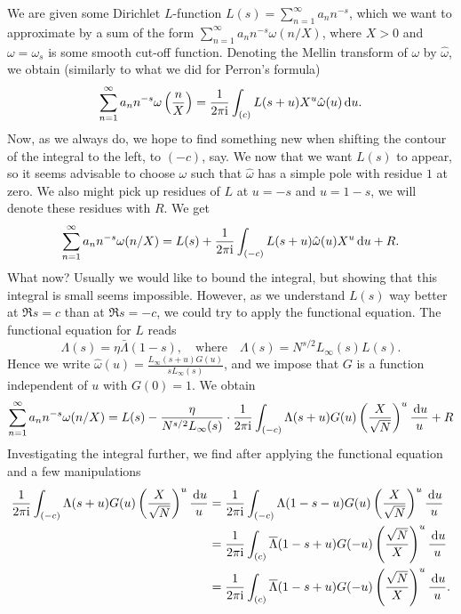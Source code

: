 \documentclass[a4paper,11pt]{article}
\begin{document}
We are given some Dirichlet $L$-function $L(s) = \sum_{n=1}^\infty a_n n^{-s}$,
which we want to approximate by a sum of the form 
$\sum_{n=1}^\infty a_n n^{-s} \omega(n/X)$, where $X>0$ and $\omega = \omega_s$
is some smooth cut-off function. Denoting the Mellin transform of $\omega$ by
$\hat \omega$, we obtain (similarly to what we did for Perron's formula)
\begin{equation}
    \sum_{n=1}^\infty a_n n^{-s} \omega\left(\frac nX \right) = \frac{1}{2 \pi \mathrm i} \int_{(c)} 
    L(s+u) X^u \hat \omega(u)  \mathrm{\,d} u.
\end{equation}
Now, as we always do, we hope to find something new when shifting the contour 
of the integral to the left, to $(-c)$, say. We now that we want $L(s)$ to appear,
so it seems advisable to choose $\omega$ such that $\hat \omega$ has a simple
pole with residue $1$ at zero. We also might pick up residues of $L$ at 
$u = -s$ and $u = 1-s$, we will denote these residues with $R$. We get
\[
    \sum_{n=1}^\infty a_n n^{-s} \omega(n/X) = 
    L(s) + \frac{1}{2 \pi \mathrm i} \int_{(-c)} L(s+u) \hat \omega(u) X^u \mathrm{\,d} u + R.
\]
What now? Usually we would like to bound the integral, but showing that this integral
is small seems impossible. However, as we understand $L(s)$ way better at 
$\Re s = c$ than at $\Re s = -c$, we could try to apply the functional equation.
The functional equation for $L$ reads
\[
    \Lambda(s) = \eta \bar \Lambda(1-s), \quad \text{where} \quad \Lambda(s) = 
    N^{s/2} L_\infty(s) L(s). 
\]
Hence we write $\hat \omega(u) = \frac{L_\infty(s+u) G(u)}{s L_\infty(s)}$, and we
impose that $G$ is a function independent of $u$ with $G(0) =1$. We obtain 
\begin{equation}
\sum_{n=1}^\infty a_n n^{-s} \omega(n/X)  = 
L(s) - \frac{\eta}{N^{s/2} L_\infty(s)} \cdot \frac1 {2\pi \mathrm i} 
\int_{(-c)} \Lambda(s+u) G(u) \left( \frac X{\sqrt N} \right)^u \frac {\mathrm{\,d} u} u + R
\end{equation} 
Investigating the integral further, we find after applying the functional equation 
and a few manipulations
\[
\begin{aligned}
    \frac{1}{2 \pi \mathrm i} \int_{(-c)} \Lambda(s+u) G(u) \left( \frac X{\sqrt N} \right)^u
    \frac {\mathrm{\,d} u} u 
    &=  \frac{1}{2 \pi \mathrm i} \int_{(-c)} \Lambda(1-s-u) G(u) \left( \frac X{\sqrt N} \right)^u \frac {\mathrm{\,d} u} u \\
    &=  \frac{1}{2 \pi \mathrm i} \int_{(c)} \overline \Lambda(1-s+u) G(-u) \left( \frac {\sqrt N}X \right)^u \frac {\mathrm{\,d} u} u \\
    &=  \frac{1}{2 \pi \mathrm i} \int_{(c)} \overline \Lambda(1-s+u) G(-u) \left( \frac {\sqrt N}X \right)^u \frac {\mathrm{\,d} u} u. 
\end{aligned}
\]
\end{document}
